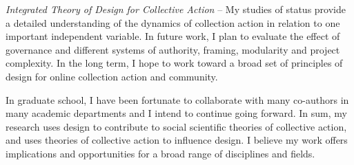 \documentclass[10pt]{memoir}
\begin{document}
\emph{Integrated Theory of Design for Collective Action} --
My studies of status provide a detailed understanding of the dynamics
of collection action in relation to one important independent
variable. In future work, I plan to evaluate the effect of governance
and different systems of authority, framing, modularity and project
complexity. In the long term, I hope to work toward a broad set of
principles of design for online collection action and community.

In graduate school, I have been fortunate to collaborate with many
co-authors in many academic departments and I intend to continue going
forward. In sum, my research uses design to contribute to social
scientific theories of collective action, and uses theories of
collective action to influence design. I believe my work offers
implications and opportunities for a broad range of disciplines and
fields.

\renewcommand{\bibsection}{\section{\bibname}\prebibhook}
\baselineskip 14.2pt


\end{document}
